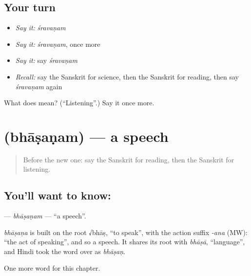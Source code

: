 \subsection*{Your turn}
\begin{itemize}
\raggedright
  \item \emph{Say it:} \emph{śravaṇam}
  \item \emph{Say it:} \emph{śravaṇam}, once more
  \item \emph{Say it:} say \emph{śravaṇam}
  \item \emph{Recall:} say the Sanskrit for science, then the Sanskrit for reading, then say \emph{śravaṇam} again
\end{itemize}

\begin{tcolorbox}[breakable,colback=teal!4,colframe=teal!35!black,title={Before you move on}]
What does  mean? (\textquotedblleft{}Listening\textquotedblright{}.) Say it once more.
\end{tcolorbox}
\section[\texorpdfstring{\sk{भाषणम्} (bhāṣaṇam)}{भाषणम् (bhāṣaṇam)}]{ (bhāṣaṇam) — a speech}

\label{lesson:SA-C200-bhasanam}



\begin{quote}
Before the new one: say the Sanskrit for reading, then the Sanskrit for listening.
\end{quote}

\subsection*{You'll want to know: }
\textbf{} — \emph{bhāṣaṇam} — \textquotedblleft{}a speech\textquotedblright{}.

\begin{cousinweb}
\emph{bhāṣaṇa} is built on the root √bhāṣ, \textquotedblleft{}to speak\textquotedblright{}, with the action suffix \emph{-ana} (MW): \textquotedblleft{}the act of speaking\textquotedblright{}, and so a speech. It shares its root with \emph{bhāṣā}, \textquotedblleft{}language\textquotedblright{}, and Hindi took the word over as \emph{bhāṣaṇ}.
\end{cousinweb}

\begin{grammarlens}[title={What you've built}]
One more word for this chapter.
\end{grammarlens}

